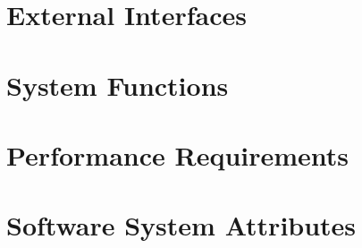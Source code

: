 \section{External Interfaces}
	
\section{System Functions}
	
\section{Performance Requirements}
	
\section{Software System Attributes}
	